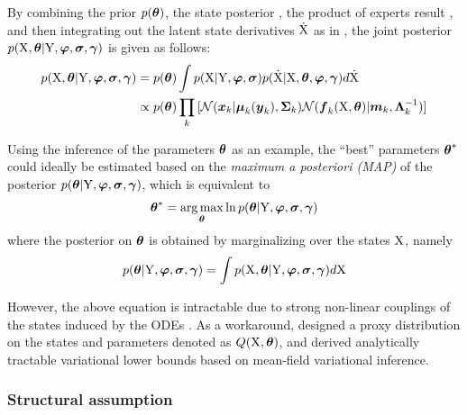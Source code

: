 By combining the prior $p(\boldsymbol{\theta})$, the state posterior  , the product of experts result , and then integrating out the latent state derivatives $\mathrm{\dot{X}}$ as in \cite{calderhead2009accelerating}, the joint posterior $p(\mathrm{X},\boldsymbol{\theta}\vert\mathrm{Y},\boldsymbol{\varphi},\boldsymbol{\sigma},\boldsymbol{\gamma})$ is given as follows:
\begin{align}
    p(\mathrm{X},\boldsymbol{\theta}\vert\mathrm{Y},\boldsymbol{\varphi},\boldsymbol{\sigma},\boldsymbol{\gamma}) 
    & = 
    p(\boldsymbol{\theta})\int{
        p(\mathrm{X}\vert\mathrm{Y},\boldsymbol{\ensuremath{\varphi}},\boldsymbol{\sigma}) p(\mathrm{\dot{X}}\vert\mathrm{X},\boldsymbol{\theta},\boldsymbol{\ensuremath{\varphi}},\boldsymbol{\gamma}) d\mathrm{\dot{X}}}
    \nonumber
    \\
    & \propto
    p(\boldsymbol{\theta}) \prod_k{[
        \mathcal{N}(\boldsymbol{x}_{k}\vert\boldsymbol{\mu}_{k}(\boldsymbol{y}_{k}), \boldsymbol{\Sigma}_{k}) 
        \mathcal{N}(\boldsymbol{f}_{k}(\mathrm{X}, \boldsymbol{\theta})\vert\boldsymbol{m}_{k},\boldsymbol{\Lambda}_{k}^{-1})]}    
    \label{eq-vgmgp-posterior-joint}
\end{align}

Using the inference of the parameters $\boldsymbol{\theta}$ as an example, the ``best'' parameters $\boldsymbol{\theta}^*$ could ideally be estimated based on the \emph{maximum a posteriori (MAP)} of the posterior $p(\boldsymbol{\theta}\vert\mathrm{Y},\boldsymbol{\varphi},\boldsymbol{\sigma},\boldsymbol{\gamma})$, which is equivalent to
\begin{align}
    \boldsymbol{\theta}^* = \operatorname*{arg\,max}_{\boldsymbol{\theta}}\ln{p(\boldsymbol{\theta}\vert\mathrm{Y},\boldsymbol{\ensuremath{\varphi}},\boldsymbol{\sigma},\boldsymbol{\gamma})}
    \label{eq-vgmgp-theta-posterior}
\end{align}
where the posterior on $\boldsymbol{\theta}$ is obtained by marginalizing  over the states $\mathrm{X}$, namely
\begin{align}
    p(\boldsymbol{\theta}\vert\mathrm{Y},\boldsymbol{\varphi},\boldsymbol{\sigma},\boldsymbol{\gamma}) = \int{p(\mathrm{X},\boldsymbol{\theta}\vert\mathrm{Y},\boldsymbol{\ensuremath{\varphi}},\boldsymbol{\sigma},\boldsymbol{\gamma})d\mathrm{X}}
    \nonumber
\end{align} 

However, the above equation is intractable due to strong non-linear couplings of the states induced by the ODEs .
As a workaround, \cite{gorbach2017scalable} designed a proxy distribution on the states and parameters denoted as $Q(\mathrm{X}, \boldsymbol{\theta})$, and derived analytically tractable variational lower bounds based on mean-field variational inference.

\subsubsection*{Structural assumption}

